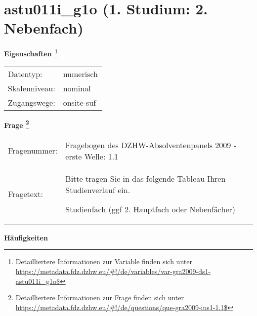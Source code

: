 
    \setcounter{footnote}{0}

    \vspace*{-1.8cm}
	\section{astu011i\_g1o (1. Studium: 2. Nebenfach)}
	\label{section:astu011i_g1o}



    \vspace*{0.5cm}
    \noindent\textbf{Eigenschaften
	\footnote{Detailliertere Informationen zur Variable finden sich unter
		\url{https://metadata.fdz.dzhw.eu/\#!/de/variables/var-gra2009-ds1-astu011i_g1o$}}}\\
	\begin{tabularx}{\hsize}{@{}lX}
	Datentyp: & numerisch \\
	Skalenniveau: & nominal \\
	Zugangswege: &
	  onsite-suf
 \\
    \end{tabularx}



				\vspace*{0.5cm}
                \noindent\textbf{Frage
	                \footnote{Detailliertere Informationen zur Frage finden sich unter
		              \url{https://metadata.fdz.dzhw.eu/\#!/de/questions/que-gra2009-ins1-1.1$}}}\\
				\begin{tabularx}{\hsize}{@{}lX}
					Fragenummer: &
					  Fragebogen des DZHW-Absolventenpanels 2009 - erste Welle:
					  1.1
 \\
					Fragetext: & Bitte tragen Sie in das folgende Tableau Ihren Studienverlauf ein.\par  Studienfach (ggf 2. Hauptfach oder Nebenfächer) \\
				\end{tabularx}





        		\vspace*{0.5cm}
                \noindent\textbf{Häufigkeiten}

